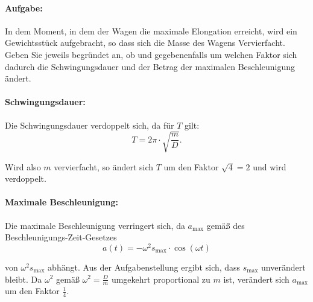 \documentclass{ajc}
\begin{document}
	\paragraph{Aufgabe:}In dem Moment, in dem der Wagen die maximale Elongation erreicht, wird ein Gewichtsstück aufgebracht, so dass sich die Masse des Wagens Vervierfacht. Geben Sie jeweils begründet an, ob und gegebenenfalls um welchen Faktor sich dadurch die Schwingungsdauer und der Betrag der maximalen Beschleunigung ändert.
	
	\paragraph{Schwingungsdauer:} Die Schwingungsdauer verdoppelt sich, da für $T$ gilt:
	\begin{equation}
		T = 2\pi \cdot \sqrt{\frac{m}{D}}.
	\end{equation}
	
	Wird also $m$ vervierfacht, so ändert sich $T$ um den Faktor $\sqrt{4} = 2$ und wird verdoppelt.
	
	\paragraph{Maximale Beschleunigung:} Die maximale Beschleunigung verringert sich, da $a_\text{max}$ gemäß des Beschleunigungs-Zeit-Gesetzes 
	\begin{equation}
		a(t) = -\omega^2 s_\text{max} \cdot \cos\left(\omega t\right)
	\end{equation}
	
	von $\omega^2 s_\text{max}$ abhängt. Aus der Aufgabenstellung ergibt sich, dass $s_\text{max}$ unverändert bleibt. Da $\omega^2$ gemäß $\omega^2 = \frac{D}{m}$ umgekehrt proportional zu $m$ ist, verändert sich $a_\text{max}$ um den Faktor $\frac{1}{4}$.
\end{document}
